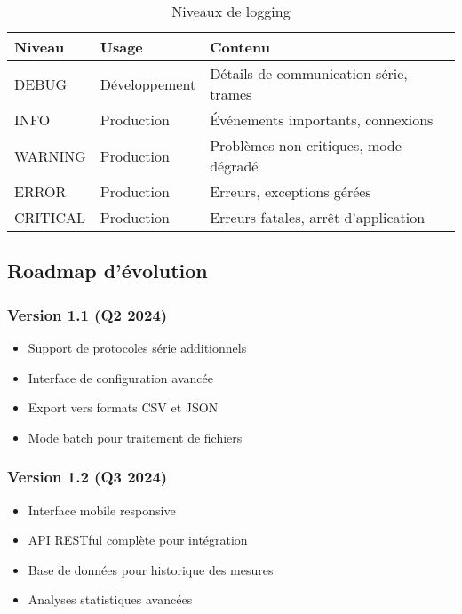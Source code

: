 \documentclass[12pt,a4paper]{article}
\begin{document}
\begin{table}[H]
\centering
\begin{tabular}{|l|l|p{7cm}|}
\hline
\textbf{Niveau} & \textbf{Usage} & \textbf{Contenu} \\
\hline
DEBUG & Développement & Détails de communication série, trames \\
\hline
INFO & Production & Événements importants, connexions \\
\hline
WARNING & Production & Problèmes non critiques, mode dégradé \\
\hline
ERROR & Production & Erreurs, exceptions gérées \\
\hline
CRITICAL & Production & Erreurs fatales, arrêt d'application \\
\hline
\end{tabular}
\caption{Niveaux de logging}
\label{tab:log_levels}
\end{table}

\subsection{Roadmap d'évolution}

\subsubsection{Version 1.1 (Q2 2024)}

\begin{itemize}
    \item Support de protocoles série additionnels
    \item Interface de configuration avancée
    \item Export vers formats CSV et JSON
    \item Mode batch pour traitement de fichiers
\end{itemize}

\subsubsection{Version 1.2 (Q3 2024)}

\begin{itemize}
    \item Interface mobile responsive
    \item API RESTful complète pour intégration
    \item Base de données pour historique des mesures
    \item Analyses statistiques avancées
\end{itemize}
\end{document}
